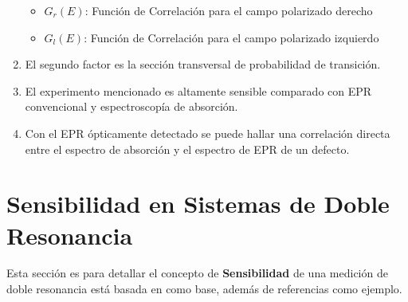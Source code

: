 \documentclass[aps,rmp,reprint,longbibliography]{revtex4-1}
\begin{document}
\begin{enumerate}
\begin{itemize}
    \item $G_r(E)$: Función de Correlación para el campo polarizado derecho 
    \item $G_l(E)$: Función de Correlación para el campo polarizado izquierdo
\end{itemize}
\item El segundo factor es la sección transversal de probabilidad de transición. 
\item El experimento mencionado es altamente sensible comparado con EPR convencional y espectroscopía de absorción. 
\item Con el EPR ópticamente detectado se puede hallar una correlación directa entre el espectro de absorción y el espectro de EPR de un defecto.
\end{enumerate}
\section{Sensibilidad en Sistemas de Doble Resonancia}
Esta sección es para detallar el concepto de \textbf{Sensibilidad} de una medición de doble resonancia está basada en \cite{b2} como base, además de referencias como ejemplo.
\end{document}
